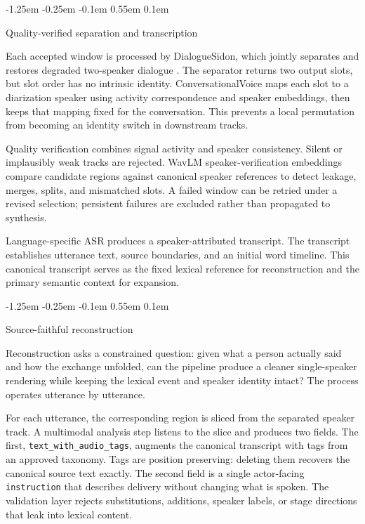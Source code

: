 \documentclass[10pt,twocolumn]{article}
\makeatletter
\renewcommand\subsection{%
  \@startsection{subsection}{2}{\z@}%
    {-1.25em \@plus -0.25em \@minus -0.1em}%
    {0.55em \@plus 0.1em}%
    {\normalfont\fontsize{10.5}{12.5}\selectfont\bfseries\raggedright
     \hyphenpenalty=10000\exhyphenpenalty=10000}}
\newcommand{\system}{\textsf{ConversationalVoice}\xspace}
\makeatother
\begin{document}
\subsection{Quality-verified separation and transcription}

Each accepted window is processed by DialogueSidon, which jointly separates and restores degraded two-speaker dialogue \citep{nakata2026dialoguesidon}. The separator returns two output slots, but slot order has no intrinsic identity. \system maps each slot to a diarization speaker using activity correspondence and speaker embeddings, then keeps that mapping fixed for the conversation. This prevents a local permutation from becoming an identity switch in downstream tracks.

Quality verification combines signal activity and speaker consistency. Silent or implausibly weak tracks are rejected. WavLM speaker-verification embeddings \citep{chen2022wavlm} compare candidate regions against canonical speaker references to detect leakage, merges, splits, and mismatched slots. A failed window can be retried under a revised selection; persistent failures are excluded rather than propagated to synthesis.

Language-specific ASR produces a speaker-attributed transcript. The transcript establishes utterance text, source boundaries, and an initial word timeline. This canonical transcript serves as the fixed lexical reference for reconstruction and the primary semantic context for expansion.

\subsection{Source-faithful reconstruction}

Reconstruction asks a constrained question: given what a person actually said and how the exchange unfolded, can the pipeline produce a cleaner single-speaker rendering while keeping the lexical event and speaker identity intact? The process operates utterance by utterance.

For each utterance, the corresponding region is sliced from the separated speaker track. A multimodal analysis step listens to the slice and produces two fields. The first, \texttt{text\_with\_audio\_tags}, augments the canonical transcript with tags from an approved taxonomy. Tags are position preserving: deleting them recovers the canonical source text exactly. The second field is a single actor-facing \texttt{instruction} that describes delivery without changing what is spoken. The validation layer rejects substitutions, additions, speaker labels, or stage directions that leak into lexical content.
\end{document}
